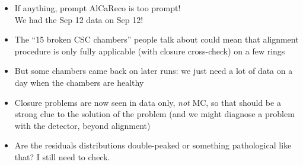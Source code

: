 \documentclass[compress]{beamer}
\begin{document}
\begin{frame}
\label{numpages}
\begin{itemize}\setlength{\itemsep}{0.35 cm}
\item If anything, prompt AlCaReco is too prompt!  \\ We had the Sep 12 data on Sep 12!
\item The ``15 broken CSC chambers'' people talk about could mean that
  alignment procedure is only fully applicable (with closure
  cross-check) on a few rings
\item But some chambers came back on later runs: we just need a lot of
  data on a day when the chambers are healthy
\item Closure problems are now seen in data only, {\it not} MC, so
  that should be a strong clue to the solution of the problem (and we
  might diagnose a problem with the detector, beyond alignment)
\item Are the residuals distributions double-peaked or something
  pathological like that?  I still need to check.
\end{itemize}
\end{frame}
\end{document}
